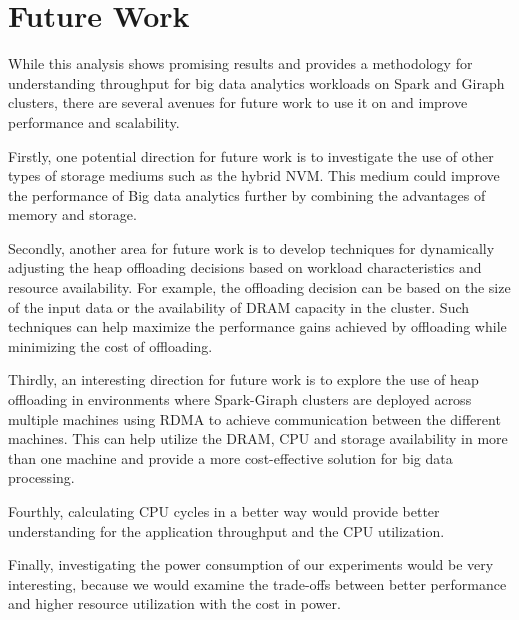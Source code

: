 \section{Future Work}

While this analysis shows promising results and provides a methodology for understanding
throughput for big data analytics workloads on Spark and Giraph
clusters, there are several avenues for future work to use it on and
improve performance and scalability. 

Firstly, one potential direction for future work is to investigate the
use of other types of storage mediums such as the hybrid NVM. This
medium could improve the performance of Big data analytics further by
combining the advantages of memory and storage.

Secondly, another area for future work is to develop techniques for
dynamically adjusting the heap offloading decisions based on workload
characteristics and resource availability. For example, the offloading
decision can be based on the size of the input data or the
availability of DRAM capacity in the cluster. Such techniques can help
maximize the performance gains achieved by offloading while minimizing
the cost of offloading.

Thirdly, an interesting direction for future work is to explore the
use of heap offloading in environments where Spark-Giraph clusters are
deployed across multiple machines using RDMA to achieve communication
between the different machines. This can help utilize the DRAM, CPU
and storage availability in more than one machine and provide a more
cost-effective solution for big data processing.

Fourthly, calculating CPU cycles in a better way would provide better understanding
for the application throughput and the CPU utilization.

Finally, investigating the power consumption of our experiments would be 
very interesting, because we would examine the trade-offs between 
better performance and higher resource utilization with the cost in power.
